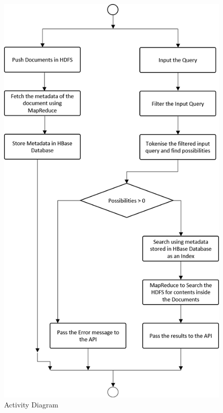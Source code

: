 \documentclass{IEEEtran}
\begin{document}
\begin{figure}[h]
\includegraphics{activity_diagram}
\caption{Activity Diagram}
\end{figure}
\end{document}
